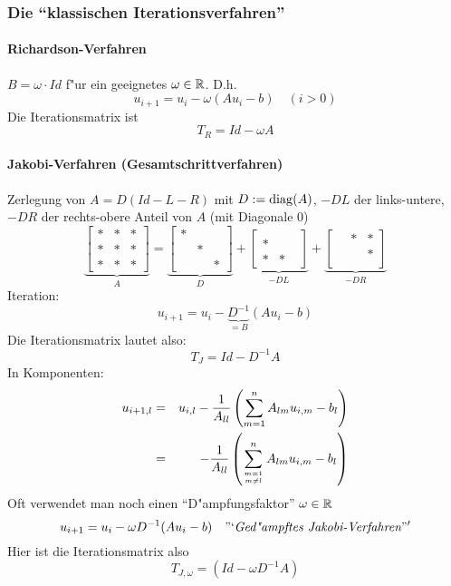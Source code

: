 \documentclass{scrartcl}
\begin{document}
\subsubsection{Die "`klassischen Iterationsverfahren"'}

\paragraph{Richardson-Verfahren}
$B = \omega \cdot Id$ f"ur ein geeignetes $\omega \in \mathbb{R}$. D.h.
$$ u_{i+1} = u_i - \omega (A u_i - b) \quad (i>0)$$
Die Iterationsmatrix ist
$$T_R = Id - \omega A$$

\paragraph{Jakobi-Verfahren (Gesamtschrittverfahren)}
Zerlegung von $A = D(Id - L - R)$ mit $D := \mathrm{diag}(A)$, $-DL$ der links-untere, $-DR$ der rechts-obere Anteil von $A$ (mit Diagonale 0)
$$ \underbrace{\left[ \begin{matrix} * & * & * \\ * & * & * \\ * & * & * \end{matrix} \right]}_{A} = 
\underbrace{\left[ \begin{matrix} * \\ & * \\ & & * \end{matrix} \right]}_D +
\underbrace{\left[ \begin{matrix} \\ * \\ * & * & \end{matrix} \right]}_{-DL} + 
\underbrace{\left[ \begin{matrix} & * & * \\ & & * \\ \ \end{matrix} \right]}_{-DR}$$
Iteration: 
$$ u_{i+1} = u_i - \underbrace{D^{-1}}_{=B} (A u_i - b)$$
Die Iterationsmatrix lautet also:
$$ T_J = Id - D^{-1}A$$
In Komponenten:
\begin{eqnarray*}
u_{i+1,l} & = & u_{i,l} - \frac{1}{A_{ll}} \left( \sum\limits_{m=1}^n A_{lm} u_{i,m} - b_l \right) \\
& = & -\frac{1}{A_{ll}} \left( \sum\limits_{\genfrac{}{}{0pt}{}{m=1}{m \neq l}}^n A_{lm} u_{i,m} - b_l \right)
\end{eqnarray*}
Oft verwendet man noch einen "`D"ampfungsfaktor"' $\omega \in \mathbb{R}$
$$ u_{i+1} = u_i - \omega D^{-1} (A u_i - b) \quad \mathrm{"`\emph{Ged"ampftes Jakobi-Verfahren}"'}$$
Hier ist die Iterationsmatrix also
$$ T_{J, \omega} = (Id - \omega D^{-1}A)$$
\end{document}

